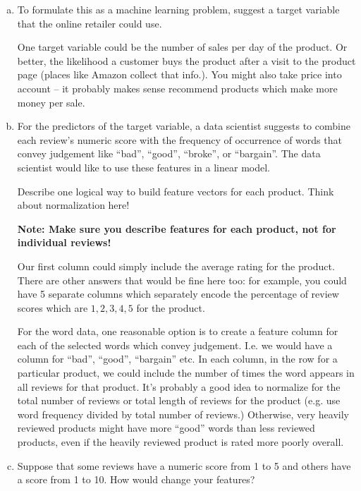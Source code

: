 \documentclass[10pt]{article}
\begin{document}
\begin{enumerate}[(a)]
	\item To formulate this as a machine learning problem, suggest a target variable that the online retailer could use.
	
	\color{blue}
	One target variable could be the number of sales per day of the product. Or better, the likelihood a customer buys the product after a visit to the product page (places like Amazon collect that info.). You might also take price into account -- it probably makes sense recommend products which make more money per sale. 
	\color{black}
	
	\item For the predictors of the target variable, a data scientist suggests to combine each review's numeric score with the frequency of occurrence of words that convey judgement like ``bad'', ``good'', ``broke'', or ``bargain''. The data scientist would like to use these features in a linear model.
	
	Describe one logical way to build feature vectors for each product. Think about normalization here!
	
	\color{blue}
	\textbf{Note: Make sure you describe features for each product, not for individual reviews!}
	
	Our first column could simply include the average rating for the product. There are other answers that would be fine here too: for example, you could have 5 separate columns which separately encode the percentage of review scores which are $1,2,3,4,5$ for the product. 
	
	For the word data, one reasonable option is to create a feature column for each of the selected words which convey judgement. I.e. we would have a column for ``bad'', ``good'', ``bargain'' etc. In each column, in the row for a particular product, we could include the number of times the word appears in all reviews for that product. It's probably a good idea to normalize for the total number of reviews or total length of reviews for the product (e.g. use word frequency divided by total number of reviews.) Otherwise, very heavily reviewed products might have more ``good'' words than less reviewed products, even if the heavily reviewed product is rated more poorly overall.
	\color{black}
		

	
	\item Suppose that some reviews have a numeric score from 1 to 5 and others have a score from 1 to 10. How would change your features?
	

\end{enumerate}
\end{document}
